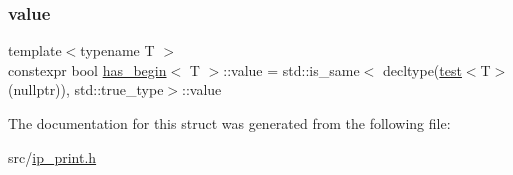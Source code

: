 \subsubsection{\texorpdfstring{value}{value}}
{\footnotesize\ttfamily template$<$typename T $>$ \\
constexpr bool \hyperlink{structhas__begin}{has\+\_\+begin}$<$ T $>$\+::value = std\+::is\+\_\+same$<$ decltype(\hyperlink{structhas__begin_a9483204ce6d4d3de89ccd58f14e73cac}{test}$<$T$>$(nullptr)), std\+::true\+\_\+type$>$\+::value\hspace{0.3cm}{\ttfamily [static]}}



The documentation for this struct was generated from the following file\+:\begin{DoxyCompactItemize}
\item 
src/\hyperlink{ip__print_8h}{ip\+\_\+print.\+h}\end{DoxyCompactItemize}
